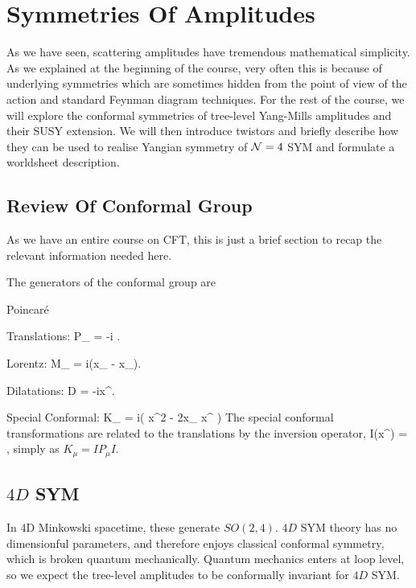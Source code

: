 \chapter{Symmetries Of Amplitudes}

As we have seen, scattering amplitudes have tremendous mathematical simplicity. As we explained at the beginning of the course, very often this is because of underlying symmetries which are sometimes hidden from the point of view of the action and standard Feynman diagram techniques. For the rest of the course, we will explore the conformal symmetries of tree-level Yang-Mills amplitudes and their SUSY extension. We will then introduce twistors and briefly describe how they can be used to realise Yangian symmetry of $\mathcal{N}=4$ SYM and formulate a worldsheet description. 

\section{Review Of Conformal Group}

As we have an entire course on CFT, this is just a brief section to recap the relevant information needed here. 

The generators of the conformal group are 
\ben[label=(\roman*)] 
    \item Poincar\'{e}
        \ben 
            \item Translations:
            \bse 
                P_{\mu} = -i .
            \ese 
            \item Lorentz:
            \bse 
                M_{\mu\nu} = i\bigg(x_{\mu} - x_{\nu}\bigg).
            \ese 
        \een 
    \item Dilatations:
    \bse 
        D = -ix^{\mu}.
    \ese
    \item Special Conformal:
    \bse 
        K_{\mu} = i\bigg( x^2  - 2x_{\mu} x^{\nu} \bigg)
    \ese 
    The special conformal transformations are related to the translations by the inversion operator,
    \bse 
        I(x^{\mu}) = ,
    \ese 
    simply as $K_{\mu} = IP_{\mu}I$.
\een 

\section{$4D$ SYM}

In 4D Minkowski spacetime, these generate $SO(2,4)$. $4D$ SYM theory has no dimensionful parameters, and therefore enjoys classical conformal symmetry, which is broken quantum mechanically. Quantum mechanics enters at loop level, so we expect the tree-level amplitudes to be conformally invariant for $4D$ SYM. 

